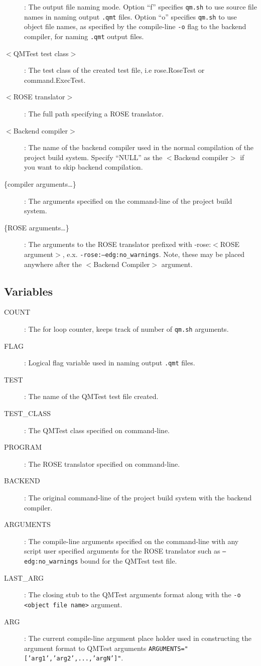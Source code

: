 \begin{description}
  \item[{\large {\tt <f|o>}}] : The output file naming mode. Option ``f'' specifies
	{\tt qm.sh} to use source file names in naming output {\tt .qmt} files.
	Option ``o'' specifies {\tt qm.sh} to use object file names, as
	specified by the compile-line {\tt -o} flag to the backend compiler,
	for naming {\tt .qmt} output files.
  \item[$<$QMTest test class$>$] : The test class of the created test file,
	i.e rose.RoseTest or command.ExecTest.
  \item[$<$ROSE translator$>$] : The full path specifying a ROSE translator.
  \item[$<$Backend compiler$>$] : The name of the backend compiler used in
	the normal compilation of the project build system. Specify ``NULL'' as
	the $<$Backend compiler$>$ if you want to skip backend compilation.
  \item[\{compiler arguments\ldots\}] : The arguments specified on
	the command-line of the project build system.
  \item[\{ROSE arguments\ldots\}] : The arguments to the ROSE translator
	prefixed with -rose:$<$ROSE argument$>$, e.x. 
	{\tt -rose:--edg:no\_warnings}. Note, these may be placed anywhere
	after the $<$Backend Compiler$>$ argument.
\end{description}

\subsection{Variables}

\begin{description}
  \item[COUNT] : The for loop counter, keeps track of number of {\tt qm.sh}
	arguments.
  \item[FLAG] : Logical flag variable used in naming output {\tt .qmt} files.
  \item[TEST] : The name of the QMTest test file created.
  \item[TEST\_CLASS] : The QMTest class specified on command-line.
  \item[PROGRAM] : The ROSE translator specified on command-line.
  \item[BACKEND] : The original command-line of the project build system with
	the backend compiler.
  \item[ARGUMENTS] : The compile-line arguments specified on the command-line
	with any script user specified arguments for the ROSE translator such
	as {\tt --edg:no\_warnings} bound for the QMTest test file.
  \item[LAST\_ARG] : The closing stub to the QMTest arguments format along with
	the {\tt -o <object file name>} argument.
  \item[ARG] : The current compile-line argument place holder used in
	constructing the argument format to QMTest arguments
	{\tt ARGUMENTS="['arg1','arg2',...,'argN']"}. 

\end{description}

